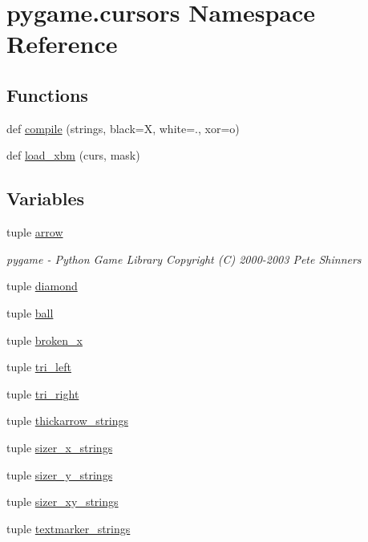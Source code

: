 \hypertarget{namespacepygame_1_1cursors}{}\section{pygame.\+cursors Namespace Reference}
\label{namespacepygame_1_1cursors}
\subsection*{Functions}
\begin{DoxyCompactItemize}
\item 
def \hyperlink{namespacepygame_1_1cursors_a19f38a01d13e77f591209869d99d99e5}{compile} (strings, black=\textquotesingle{}X\textquotesingle{}, white=\textquotesingle{}.\textquotesingle{}, xor=\textquotesingle{}o\textquotesingle{})
\item 
def \hyperlink{namespacepygame_1_1cursors_a2a84c8676fb5765acdb5556d7bf9ca22}{load\+\_\+xbm} (curs, mask)
\end{DoxyCompactItemize}
\subsection*{Variables}
\begin{DoxyCompactItemize}
\item 
tuple \hyperlink{namespacepygame_1_1cursors_af1f11288e22a66d5740e960da4da51b2}{arrow}
\begin{DoxyCompactList}\small\item\em pygame -\/ Python Game Library Copyright (C) 2000-\/2003 Pete Shinners \end{DoxyCompactList}\item 
tuple \hyperlink{namespacepygame_1_1cursors_a548edbe0912474b543f62821a6f93466}{diamond}
\item 
tuple \hyperlink{namespacepygame_1_1cursors_af65f9378a20934bb0164ba76d0acaa7e}{ball}
\item 
tuple \hyperlink{namespacepygame_1_1cursors_a85c7b15bfadda6d7d8c6df861376f4b7}{broken\+\_\+x}
\item 
tuple \hyperlink{namespacepygame_1_1cursors_ab8f9d468f408955fabc83a987ec5d043}{tri\+\_\+left}
\item 
tuple \hyperlink{namespacepygame_1_1cursors_a4713aff102abe2b2d27c5ebe1b853bcc}{tri\+\_\+right}
\item 
tuple \hyperlink{namespacepygame_1_1cursors_ae6ff5b89a2625015133293e6cce576d9}{thickarrow\+\_\+strings}
\item 
tuple \hyperlink{namespacepygame_1_1cursors_a9e8996ddcf02b7a1f494f6ee00a9bf52}{sizer\+\_\+x\+\_\+strings}
\item 
tuple \hyperlink{namespacepygame_1_1cursors_a1e9668d9192c520351b6fc6ea6aeb1ab}{sizer\+\_\+y\+\_\+strings}
\item 
tuple \hyperlink{namespacepygame_1_1cursors_a9647ff45f5032a1cfd9745fbcb588512}{sizer\+\_\+xy\+\_\+strings}
\item 
tuple \hyperlink{namespacepygame_1_1cursors_a44fb57310f6f4f5a8a008acdfda21d2c}{textmarker\+\_\+strings}
\end{DoxyCompactItemize}


